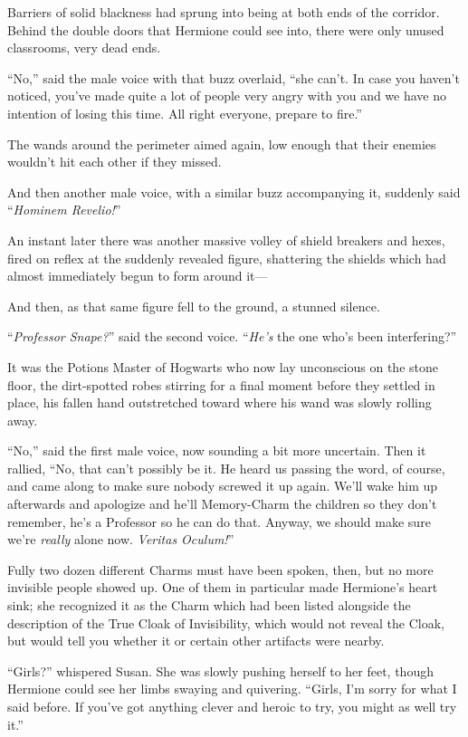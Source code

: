 Barriers of solid blackness had sprung into being at both ends of the corridor. Behind the double doors that Hermione could see into, there were only unused classrooms, very dead ends.

“No,” said the male voice with that buzz overlaid, “she can’t. In case you haven’t noticed, you’ve made quite a lot of people very angry with you and we have no intention of losing this time. All right everyone, prepare to fire.”

The wands around the perimeter aimed again, low enough that their enemies wouldn’t hit each other if they missed.

And then another male voice, with a similar buzz accompanying it, suddenly said “\emph{Hominem Revelio!}”

An instant later there was another massive volley of shield breakers and hexes, fired on reflex at the suddenly revealed figure, shattering the shields which had almost immediately begun to form around it—

And then, as that same figure fell to the ground, a stunned silence.

“\emph{Professor Snape?}” said the second voice. “\emph{He’s} the one who’s been interfering?”

It was the Potions Master of Hogwarts who now lay unconscious on the stone floor, the dirt-spotted robes stirring for a final moment before they settled in place, his fallen hand outstretched toward where his wand was slowly rolling away.

“No,” said the first male voice, now sounding a bit more uncertain. Then it rallied, “No, that can’t possibly be it. He heard us passing the word, of course, and came along to make sure nobody screwed it up again. We’ll wake him up afterwards and apologize and he’ll Memory-Charm the children so they don’t remember, he’s a Professor so he can do that. Anyway, we should make sure we’re \emph{really} alone now. \emph{Veritas Oculum!}”

Fully two dozen different Charms must have been spoken, then, but no more invisible people showed up. One of them in particular made Hermione’s heart sink; she recognized it as the Charm which had been listed alongside the description of the True Cloak of Invisibility, which would not reveal the Cloak, but would tell you whether it or certain other artifacts were nearby.

“Girls?” whispered Susan. She was slowly pushing herself to her feet, though Hermione could see her limbs swaying and quivering. “Girls, I’m sorry for what I said before. If you’ve got anything clever and heroic to try, you might as well try it.”


